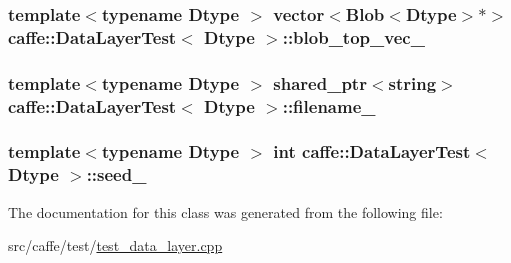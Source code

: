 \hypertarget{classcaffe_1_1_data_layer_test_a591c04139193a11697a051889cddf83d}{
\subsubsection[{blob\+\_\+top\+\_\+vec\+\_\+}]{\setlength{\rightskip}{0pt plus 5cm}template$<$typename Dtype $>$ vector$<${\bf Blob}$<$Dtype$>$$\ast$$>$ {\bf caffe\+::\+Data\+Layer\+Test}$<$ Dtype $>$\+::blob\+\_\+top\+\_\+vec\+\_\+\hspace{0.3cm}{\ttfamily [protected]}}}\label{classcaffe_1_1_data_layer_test_a591c04139193a11697a051889cddf83d}
\hypertarget{classcaffe_1_1_data_layer_test_a96918f4c6321111e66d795f4341fd656}{
\subsubsection[{filename\+\_\+}]{\setlength{\rightskip}{0pt plus 5cm}template$<$typename Dtype $>$ shared\+\_\+ptr$<$string$>$ {\bf caffe\+::\+Data\+Layer\+Test}$<$ Dtype $>$\+::filename\+\_\+\hspace{0.3cm}{\ttfamily [protected]}}}\label{classcaffe_1_1_data_layer_test_a96918f4c6321111e66d795f4341fd656}
\hypertarget{classcaffe_1_1_data_layer_test_acf77bf66c5261af404bc1aa28fc3e7d0}{
\subsubsection[{seed\+\_\+}]{\setlength{\rightskip}{0pt plus 5cm}template$<$typename Dtype $>$ int {\bf caffe\+::\+Data\+Layer\+Test}$<$ Dtype $>$\+::seed\+\_\+\hspace{0.3cm}{\ttfamily [protected]}}}\label{classcaffe_1_1_data_layer_test_acf77bf66c5261af404bc1aa28fc3e7d0}


The documentation for this class was generated from the following file\+:\begin{DoxyCompactItemize}
\item 
src/caffe/test/\hyperlink{test__data__layer_8cpp}{test\+\_\+data\+\_\+layer.\+cpp}\end{DoxyCompactItemize}
